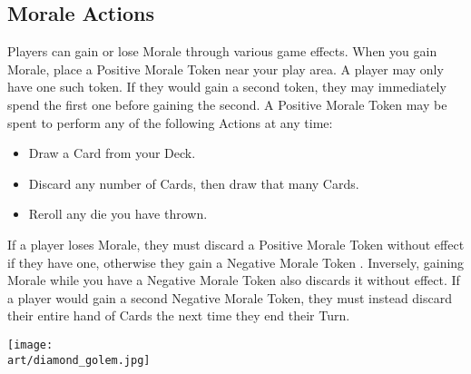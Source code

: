 \begin{multicols*}{2}
\subsection*{Morale Actions}
Players can gain or lose Morale through various game effects.
When you gain Morale, place a Positive Morale Token  near your play area.
A player may only have one such token.
If they would gain a second token, they may immediately spend the first one before gaining the second.
A Positive Morale Token may be spent to perform any of the following Actions at any time:
\begin{itemize}
  \item Draw a Card from your Deck.
  \item Discard any number of Cards, then draw that many Cards.
  \item Reroll any die you have thrown.
\end{itemize}

If a player loses Morale, they must discard a Positive Morale Token  without effect if they have one, otherwise they gain a Negative Morale Token .
Inversely, gaining Morale while you have a Negative Morale Token also discards it without effect.
If a player would gain a second Negative Morale Token, they must instead discard their entire hand of Cards the next time they end their Turn.\par


\vspace*{\fill}
\begin{center}
  \texttt{[image: \\art/diamond\_golem.jpg]}
\end{center}

\end{multicols*}
